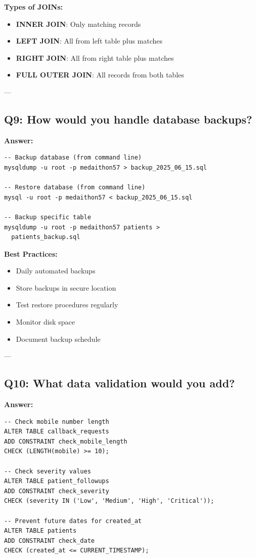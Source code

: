 \documentclass[12pt,a4paper]{article}
\begin{document}
\textbf{Types of JOINs:}
\begin{itemize}
    \item \textbf{INNER JOIN}: Only matching records
    \item \textbf{LEFT JOIN}: All from left table plus matches
    \item \textbf{RIGHT JOIN}: All from right table plus matches
    \item \textbf{FULL OUTER JOIN}: All records from both tables
\end{itemize}

---

\subsection{Q9: How would you handle database backups?}

\textbf{Answer:}

\begin{lstlisting}[caption={Backup and Restore}]
-- Backup database (from command line)
mysqldump -u root -p medaithon57 > backup_2025_06_15.sql

-- Restore database (from command line)
mysql -u root -p medaithon57 < backup_2025_06_15.sql

-- Backup specific table
mysqldump -u root -p medaithon57 patients > 
  patients_backup.sql
\end{lstlisting}

\textbf{Best Practices:}
\begin{itemize}
    \item Daily automated backups
    \item Store backups in secure location
    \item Test restore procedures regularly
    \item Monitor disk space
    \item Document backup schedule
\end{itemize}

---

\subsection{Q10: What data validation would you add?}

\textbf{Answer:}

\begin{lstlisting}[caption={Data Validation Checks}]
-- Check mobile number length
ALTER TABLE callback_requests
ADD CONSTRAINT check_mobile_length
CHECK (LENGTH(mobile) >= 10);

-- Check severity values
ALTER TABLE patient_followups
ADD CONSTRAINT check_severity
CHECK (severity IN ('Low', 'Medium', 'High', 'Critical'));

-- Prevent future dates for created_at
ALTER TABLE patients
ADD CONSTRAINT check_date
CHECK (created_at <= CURRENT_TIMESTAMP);
\end{lstlisting}
\end{document}
